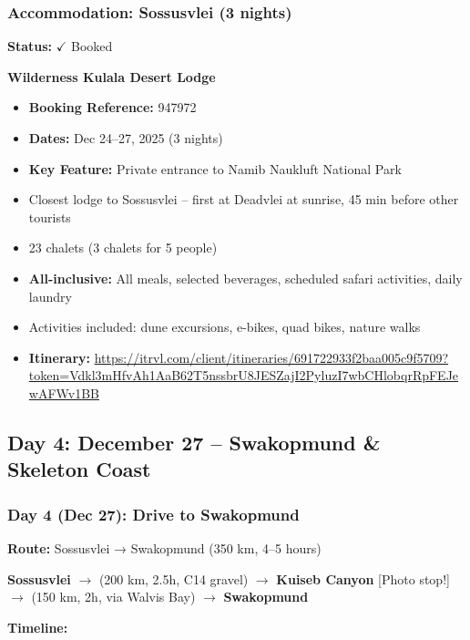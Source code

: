 \documentclass[11pt]{article}
\newcommand{\booked}{\textcolor{accentcolor}{$\checkmark$ Booked}}
\begin{document}
\clearpage
\subsubsection{Accommodation: Sossusvlei (3 nights)}

\textbf{Status:} \booked

\textbf{Wilderness Kulala Desert Lodge}
\begin{itemize}
    \item \textbf{Booking Reference:} 947972
    \item \textbf{Dates:} Dec 24--27, 2025 (3 nights)
    \item \textbf{Key Feature:} Private entrance to Namib Naukluft National Park
    \item Closest lodge to Sossusvlei -- first at Deadvlei at sunrise, 45 min before other tourists
    \item 23 chalets (3 chalets for 5 people)
    \item \textbf{All-inclusive:} All meals, selected beverages, scheduled safari activities, daily laundry
    \item Activities included: dune excursions, e-bikes, quad bikes, nature walks
    \item \textbf{Itinerary:} \url{https://itrvl.com/client/itineraries/691722933f2baa005c9f5709?token=Vdkl3mHfvAh1AaB62T5nssbrU8JESZajI2PyluzI7wbCHlobqrRpFEJewAFWv1BB}
\end{itemize}

\clearpage
\subsection{Day 4: December 27 -- Swakopmund \& Skeleton Coast}

\subsubsection{Day 4 (Dec 27): Drive to Swakopmund}

\textbf{Route:} Sossusvlei → Swakopmund (350 km, 4--5 hours)

\noindent\textbf{Sossusvlei} $\rightarrow$ (200 km, 2.5h, C14 gravel) $\rightarrow$ \textbf{Kuiseb Canyon} [Photo stop!] $\rightarrow$ (150 km, 2h, via Walvis Bay) $\rightarrow$ \textbf{Swakopmund}

\textbf{Timeline:}
\end{document}
